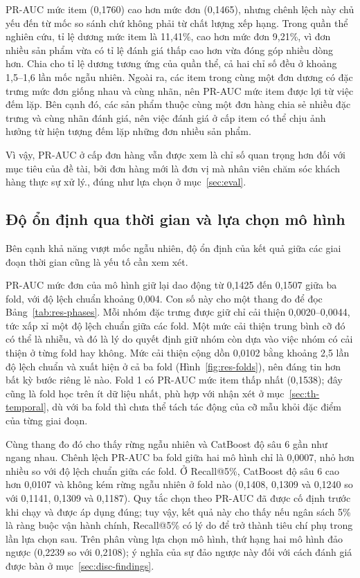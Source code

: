 \documentclass[12pt,a4paper]{report}
\begin{document}
PR-AUC mức item (0,1760) cao hơn mức đơn (0,1465), nhưng chênh lệch này chủ yếu đến từ mốc so sánh chứ không phải từ chất lượng xếp hạng. Trong quần thể nghiên cứu, tỉ lệ dương mức item là 11,41\%, cao hơn mức đơn 9,21\%, vì đơn nhiều sản phẩm vừa có tỉ lệ đánh giá thấp cao hơn vừa đóng góp nhiều dòng hơn. Chia cho tỉ lệ dương tương ứng của quần thể, cả hai chỉ số đều ở khoảng 1,5--1,6 lần mốc ngẫu nhiên. Ngoài ra, các item trong cùng một đơn dương có đặc trưng mức đơn giống nhau và cùng nhãn, nên PR-AUC mức item được lợi từ việc đếm lặp. Bên cạnh đó, các sản phẩm thuộc cùng một đơn hàng chia sẻ nhiều đặc trưng và cùng nhãn đánh giá, nên việc đánh giá ở cấp item có thể chịu ảnh hưởng từ hiện tượng đếm lặp những đơn nhiều sản phẩm. 

Vì vậy, PR-AUC ở cấp đơn hàng vẫn được xem là chỉ số quan trọng hơn đối với mục tiêu của đề tài, bởi đơn hàng mới là đơn vị mà nhân viên chăm sóc khách hàng thực sự xử lý., đúng như lựa chọn ở mục~\ref{sec:eval}.

\subsection{Độ ổn định qua thời gian và lựa chọn mô hình}\label{sec:analysis-stability}

Bên cạnh khả năng vượt mốc ngẫu nhiên, độ ổn định của kết quả giữa các giai đoạn thời gian cũng là yếu tố cần xem xét.

PR-AUC mức đơn của mô hình giữ lại dao động từ 0,1425 đến 0,1507 giữa ba fold, với độ lệch chuẩn khoảng 0,004. Con số này cho một thang đo để đọc Bảng~\ref{tab:res-phases}. Mỗi nhóm đặc trưng được giữ chỉ cải thiện 0,0020--0,0044, tức xấp xỉ một độ lệch chuẩn giữa các fold. Một mức cải thiện trung bình cỡ đó có thể là nhiễu, và đó là lý do quyết định giữ nhóm còn dựa vào việc nhóm có cải thiện ở từng fold hay không. Mức cải thiện cộng dồn 0,0102 bằng khoảng 2,5 lần độ lệch chuẩn và xuất hiện ở cả ba fold (Hình~\ref{fig:res-folds}), nên đáng tin hơn bất kỳ bước riêng lẻ nào. Fold 1 có PR-AUC mức item thấp nhất (0,1538); đây cũng là fold học trên ít dữ liệu nhất, phù hợp với nhận xét ở mục~\ref{sec:th-temporal}, dù với ba fold thì chưa thể tách tác động của cỡ mẫu khỏi đặc điểm của từng giai đoạn.

Cùng thang đo đó cho thấy rừng ngẫu nhiên và CatBoost độ sâu 6 gần như ngang nhau. Chênh lệch PR-AUC ba fold giữa hai mô hình chỉ là 0,0007, nhỏ hơn nhiều so với độ lệch chuẩn giữa các fold. Ở Recall@5\%, CatBoost độ sâu 6 cao hơn 0,0107 và không kém rừng ngẫu nhiên ở fold nào (0,1408, 0,1309 và 0,1240 so với 0,1141, 0,1309 và 0,1187). Quy tắc chọn theo PR-AUC đã được cố định trước khi chạy và được áp dụng đúng; tuy vậy, kết quả này cho thấy nếu ngân sách 5\% là ràng buộc vận hành chính, Recall@5\% có lý do để trở thành tiêu chí phụ trong lần lựa chọn sau. Trên phân vùng lựa chọn mô hình, thứ hạng hai mô hình đảo ngược (0,2239 so với 0,2108); ý nghĩa của sự đảo ngược này đối với cách đánh giá được bàn ở mục~\ref{sec:disc-findings}.
\end{document}
